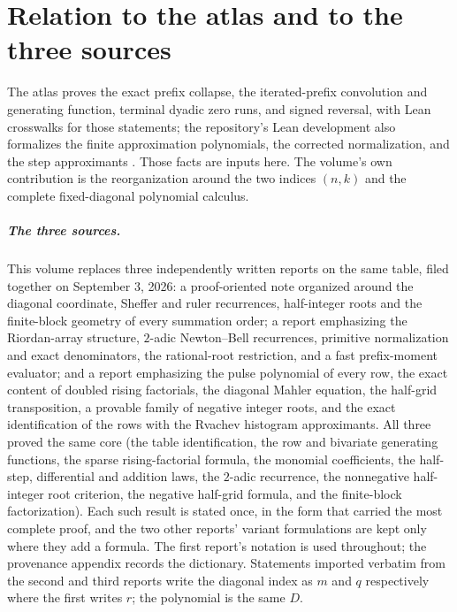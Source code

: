 \documentclass[11pt,a4paper,oneside,openany]{book}
\numberwithin{equation}{chapter}
\theoremstyle{definition}
\theoremstyle{remark}
\newcommand{\Diag}{D}
\begin{document}
\chapter*{Relation to the atlas and to the three sources}
The atlas \cite{atlas} proves the exact prefix collapse, the iterated-prefix
convolution and generating function, terminal dyadic zero runs, and signed
reversal, with Lean crosswalks for those statements; the repository's Lean
development also formalizes the finite approximation polynomials, the
corrected normalization, and the step approximants
\cite{proveit-prefix,proveit-approx}. Those facts are inputs here. The
volume's own contribution is the reorganization around the two indices
$(n,k)$ and the complete fixed-diagonal polynomial calculus.

\paragraph{The three sources.}
This volume replaces three independently written reports on the same
table, filed together on September 3, 2026: a proof-oriented note
organized around the diagonal coordinate, Sheffer and ruler recurrences,
half-integer roots and the finite-block geometry of every summation order;
a report emphasizing the Riordan-array structure, $2$-adic Newton--Bell
recurrences, primitive normalization and exact denominators, the
rational-root restriction, and a fast prefix-moment evaluator; and a report
emphasizing the pulse polynomial of every row, the exact content of doubled
rising factorials, the diagonal Mahler equation, the half-grid
transposition, a provable family of negative integer roots, and the exact
identification of the rows with the Rvachev histogram approximants. All
three proved the same core (the table identification, the row and bivariate
generating functions, the sparse rising-factorial formula, the monomial
coefficients, the half-step, differential and addition laws, the
$2$-adic recurrence, the nonnegative half-integer root criterion, the
negative half-grid formula, and the finite-block factorization). Each such
result is stated once, in the form that carried the most complete proof,
and the two other reports' variant formulations are kept only where they
add a formula. The first report's notation is used throughout; the
provenance appendix records the dictionary. Statements imported verbatim
from the second and third reports write the diagonal index as $m$ and $q$
respectively where the first writes $r$; the polynomial is the same
$\Diag$.
\end{document}
